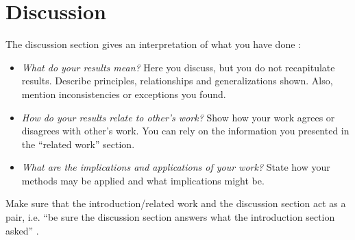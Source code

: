 %
\newpage
\chapter{Discussion}
The discussion section gives an interpretation of what you have done \cite{day2006wap}:

\begin{itemize}
 \item \textit{What do your results mean?} Here you discuss, but you do not recapitulate results. Describe principles, relationships and generalizations shown. Also, mention inconsistencies or exceptions you found.
 \item \textit{How do your results relate to other's work?} Show how your work agrees or disagrees with other's work. You can rely on the information you presented in the ``related work'' section.
 \item \textit{What are the implications and applications of your work?} State how your methods may be applied and what implications might be. 
\end{itemize}

\noindent Make sure that the introduction/related work and the discussion section act as a pair, i.e. ``be sure the discussion section answers what the introduction section asked'' \cite{day2006wap}. 
